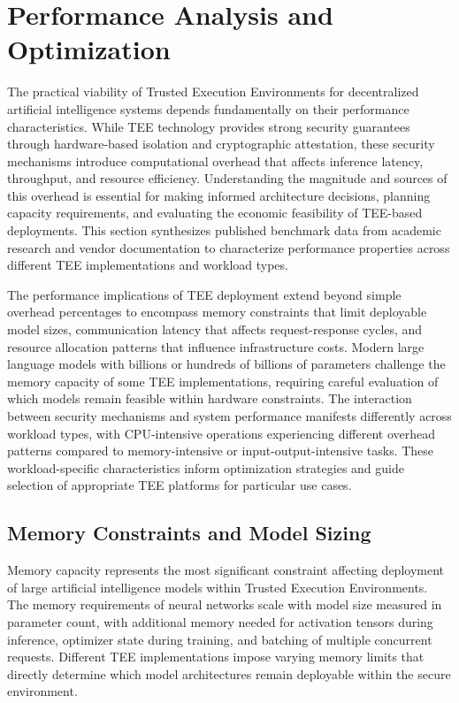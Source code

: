 \section{Performance Analysis and Optimization}

The practical viability of Trusted Execution Environments for decentralized artificial intelligence systems depends fundamentally on their performance characteristics. While TEE technology provides strong security guarantees through hardware-based isolation and cryptographic attestation, these security mechanisms introduce computational overhead that affects inference latency, throughput, and resource efficiency. Understanding the magnitude and sources of this overhead is essential for making informed architecture decisions, planning capacity requirements, and evaluating the economic feasibility of TEE-based deployments. This section synthesizes published benchmark data from academic research and vendor documentation to characterize performance properties across different TEE implementations and workload types.

The performance implications of TEE deployment extend beyond simple overhead percentages to encompass memory constraints that limit deployable model sizes, communication latency that affects request-response cycles, and resource allocation patterns that influence infrastructure costs. Modern large language models with billions or hundreds of billions of parameters challenge the memory capacity of some TEE implementations, requiring careful evaluation of which models remain feasible within hardware constraints. The interaction between security mechanisms and system performance manifests differently across workload types, with CPU-intensive operations experiencing different overhead patterns compared to memory-intensive or input-output-intensive tasks. These workload-specific characteristics inform optimization strategies and guide selection of appropriate TEE platforms for particular use cases.

\subsection{Memory Constraints and Model Sizing}

Memory capacity represents the most significant constraint affecting deployment of large artificial intelligence models within Trusted Execution Environments. The memory requirements of neural networks scale with model size measured in parameter count, with additional memory needed for activation tensors during inference, optimizer state during training, and batching of multiple concurrent requests. Different TEE implementations impose varying memory limits that directly determine which model architectures remain deployable within the secure environment.

